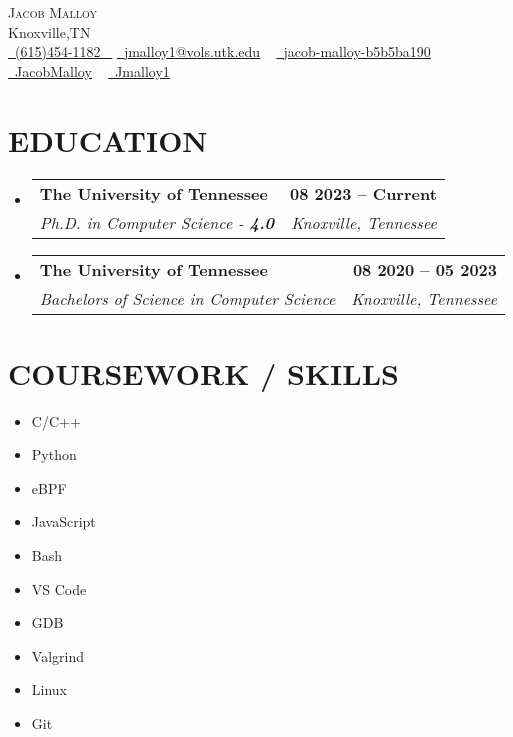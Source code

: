 \documentclass[letterpaper,10pt]{article}
\makeatletter
\newcommand{\resumeSubheading}[4]{
    \vspace{-2pt}\item
        \begin{tabular*}{1.0\textwidth}[t]{l@{\extracolsep{\fill}}r}
            \textbf{\large#1} & \textbf{\small #2} \\
            \textit{\large#3} & \textit{\small #4} \\

        \end{tabular*}\vspace{-7pt}
}
\newcommand{\resumeSubHeadingListStart}{\begin{itemize}[leftmargin=0.0in, label={}]}
\newcommand{\resumeSubHeadingListEnd}{\end{itemize}}
\makeatother
\begin{document}

\begin{center}
        {\Huge \scshape Jacob Malloy} \\ \vspace{1pt}
        Knoxville,TN \\ \vspace{1pt}
        \small \href{tel:+16154541182}{ \raisebox{-0.1\height}\faPhone\ \underline{(615)454-1182} ~} \href{mailto:jmalloy1@vols.utk.edu}{\raisebox{-0.2\height}\faEnvelope\  \underline{jmalloy1@vols.utk.edu}} ~
        \href{https://www.linkedin.com/in/jacob-malloy-b5b5ba190/}{\raisebox{-0.2\height}\faLinkedin\ \underline{jacob-malloy-b5b5ba190}}  ~
        \href{https://github.com/jacobmalloy}{\raisebox{-0.2\height}\faGithub\ \underline{JacobMalloy}} ~
        \href{https://gitlab.com/jmalloy1}{\raisebox{-0.2\height}\faGitlab\ \underline{Jmalloy1}} ~
        \vspace{-8pt}
\end{center}


\section{EDUCATION}
    \resumeSubHeadingListStart
        \resumeSubheading
            {The University of Tennessee}{08 2023 -- Current}
            {Ph.D. in Computer Science - \textbf{4.0}}{Knoxville, Tennessee}
        \resumeSubheading
            {The University of Tennessee}{08 2020 -- 05 2023}
            {Bachelors of Science in Computer Science}{Knoxville, Tennessee}
    \resumeSubHeadingListEnd

\section{COURSEWORK / SKILLS}
                \begin{multicols}{5}
                        \begin{itemize}[itemsep=-2pt, parsep=4pt]
                                \item C/C++
                                \item Python
                                \item eBPF
                                \item JavaScript
                                \item Bash
                                \item VS Code
                                \item GDB
                                \item Valgrind
                                \item Linux
                                \item Git
                        \end{itemize}
                \end{multicols}
                \vspace*{2.0\multicolsep}
\end{document}
